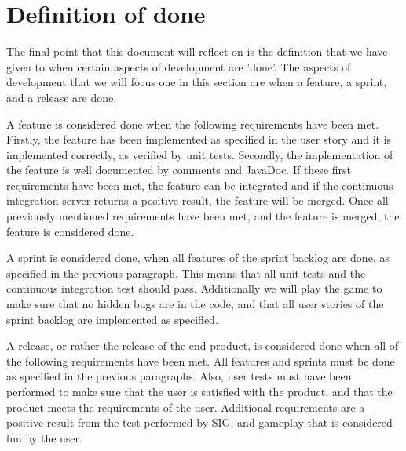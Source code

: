 \documentclass{article}
\begin{document}
\section{Definition of done}
The final point that this document will reflect on is the definition that we have given to when certain aspects of development are 'done'. The aspects of development that we will focus one in this section are when a feature, a sprint, and a release are done.

A feature is considered done when the following requirements have been met. Firstly, the feature has been implemented as specified in the user story and it is implemented correctly, as verified by unit tests. Secondly, the implementation of the feature is well documented by comments and JavaDoc. If these first requirements have been met, the feature can be integrated and if the continuous integration server returns a positive result, the feature will be merged. Once all previously mentioned requirements have been met, and the feature is merged, the feature is considered done.

A sprint is considered done, when all features of the sprint backlog are done, as specified in the previous paragraph. This means that all unit tests and the continuous integration test should pass. Additionally we will play the game to make sure that no hidden bugs are in the code, and that all user stories of the sprint backlog are implemented as specified.

A release, or rather the release of the end product, is considered done when all of the following requirements have been met. All features and sprints must be done as specified in the previous paragraphs. Also, user tests must have been performed to make sure that the user is satisfied with the product, and that the product meets the requirements of the user. Additional requirements are a positive result from the test performed by SIG, and gameplay that is considered fun by the user.
\pagebreak
\end{document}
